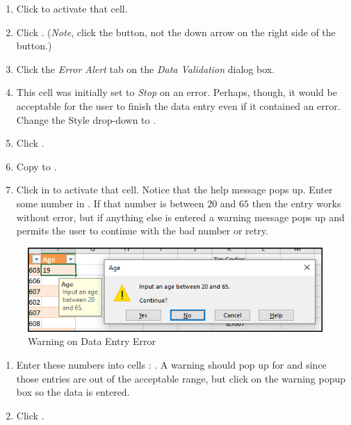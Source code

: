\begin{enumerate}[resume]	
	\item Click  to activate that cell.
	\item Click . (\textit{Note}, click the button, not the down arrow on the right side of the button.)
	\item Click the \textit{Error Alert} tab on the \textit{Data Validation} dialog box. 
	\item This cell was initially set to \textit{Stop} on an error. Perhaps, though, it would be acceptable for the user to finish the data entry even if it contained an error. Change the Style drop-down to .
	\item Click .
	\item Copy  to .
	\item Click in  to activate that cell. Notice that the help message pops up. Enter some number in . If that number is between $ 20 $ and $ 65 $ then the entry works without error, but if anything else is entered a warning message pops up and permits the user to continue with the bad number or retry.
\end{enumerate}

\begin{figure}[H]
	\centering
	\includegraphics[width=\maxwidth{.95\linewidth}]{gfx/ch07_fig41}
	\caption{Warning on Data Entry Error}
	\label{07:fig41}
\end{figure}

\begin{enumerate}[resume]	
	\item Enter these numbers into cells : . A warning should pop up for  and  since those entries are out of the acceptable range, but click  on the warning popup box so the data is entered.
	\item Click .
\end{enumerate}


